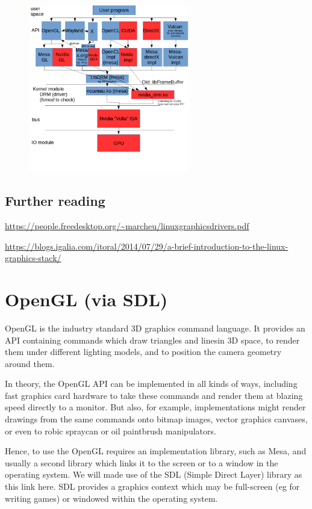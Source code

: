 \documentclass[oneside,english]{scrbook}
\begin{document}
\begin{figure}
	\caption{}
	\includegraphics[width=7cm]{figs/graphicsStack.png}
\end{figure}

\section{Further reading}
\url{https://people.freedesktop.org/~marcheu/linuxgraphicsdrivers.pdf}

\url{https://blogs.igalia.com/itoral/2014/07/29/a-brief-introduction-to-the-linux-graphics-stack/}


\chapter{OpenGL (via SDL)}

OpenGL is the industry standard 3D graphics command language.  It provides an API containing commands which draw triangles and linesin 3D space, to render them under different lighting models, and to position the camera geometry around them.

In theory, the OpenGL API can be implemented in all kinds of ways, including fast graphics card hardware to take these commands and render them at blazing speed directly to a monitor. But also, for example, implementations might render drawings from the same commands onto bitmap images, vector graphics canvases, or even to robic spraycan or oil paintbrush manipulators.

Hence, to use the OpenGL requires an implementation library, such as Mesa, and usually a second library which links it to the screen or to a window in the operating system.   We will made use of the SDL (Simple Direct Layer) library as this link here.   SDL provides a graphics context which may be full-screen (eg for writing games) or windowed within the operating system.   
\end{document}
